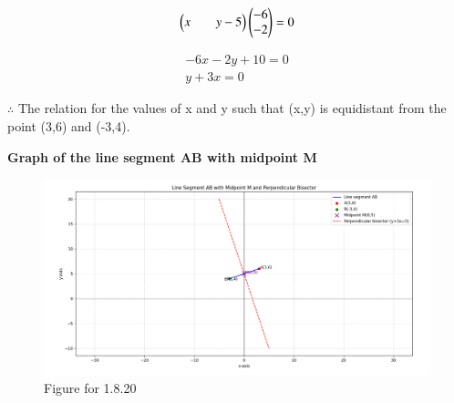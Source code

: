 \documentclass[journal]{IEEEtran}
\begin{document}
\begin{align}
    \begin{pmatrix}x&&y-5\end{pmatrix}\begin{pmatrix}-6\\-2\end{pmatrix} = 0
\end{align}

\begin{align}
    -6x-2y+10=0\\
    y+3x=0
\end{align}

$\therefore$ The relation for the values of x and y such that (x,y) is equidistant from the point (3,6) and (-3,4).

\textbf{Graph of the line segment AB with midpoint M}
\begin{figure}[H]
    \centering
    \includegraphics[width=1.1\columnwidth]{figs/fig1.png}
    \caption{Figure for 1.8.20}
    \label{fig1}
\end{figure}
\end{document}

